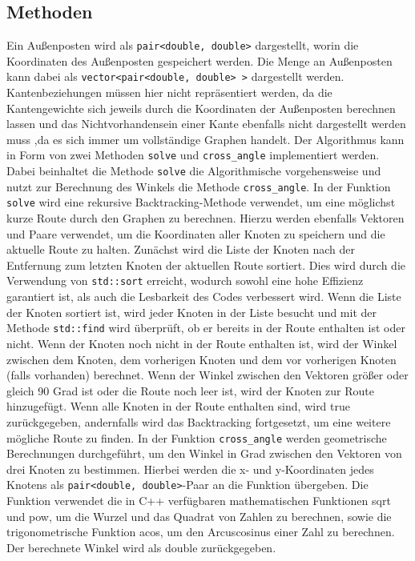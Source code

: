 \documentclass[a4paper,10pt,ngerman]{scrartcl}
\begin{document}
    \subsection{Methoden}\label{subsec:methoden}
    Ein Außenposten wird als \texttt{pair<double, double>} dargestellt, worin die Koordinaten des Außenposten gespeichert werden.
    Die Menge an Außenposten kann dabei als \texttt{vector<pair<double, double> >} dargestellt werden.
    Kantenbeziehungen müssen hier nicht repräsentiert werden, da die Kantengewichte sich jeweils durch die Koordinaten der Außenposten berechnen lassen
    und das Nichtvorhandensein einer Kante ebenfalls nicht dargestellt werden muss ,da es sich immer um vollständige Graphen handelt.
    Der Algorithmus kann in Form von zwei Methoden \texttt{solve} und \texttt{cross\_angle} implementiert werden.
    \newline
    Dabei beinhaltet die Methode \texttt{solve} die Algorithmische vorgehensweise und nutzt zur Berechnung des Winkels die Methode \texttt{cross\_angle}.
    In der Funktion \texttt{solve} wird eine rekursive Backtracking-Methode verwendet, um eine möglichst kurze Route durch den Graphen zu berechnen.
    Hierzu werden ebenfalls Vektoren und Paare verwendet, um die Koordinaten aller Knoten zu speichern und die aktuelle Route zu halten.
    Zunächst wird die Liste der Knoten nach der Entfernung zum letzten Knoten der aktuellen Route sortiert.
    Dies wird durch die Verwendung von \texttt{std::sort} erreicht, wodurch sowohl eine hohe Effizienz garantiert ist,
    als auch die Lesbarkeit des Codes verbessert wird.
    Wenn die Liste der Knoten sortiert ist, wird jeder Knoten in der Liste besucht und mit der Methode \texttt{std::find} wird überprüft,
    ob er bereits in der Route enthalten ist oder nicht.
    Wenn der Knoten noch nicht in der Route enthalten ist, wird der Winkel zwischen dem Knoten, dem vorherigen Knoten und dem vor vorherigen Knoten (falls vorhanden) berechnet.
    Wenn der Winkel zwischen den Vektoren größer oder gleich 90 Grad ist oder die Route noch leer ist, wird der Knoten zur Route hinzugefügt.
    Wenn alle Knoten in der Route enthalten sind, wird true zurückgegeben, andernfalls wird das Backtracking fortgesetzt, um eine weitere mögliche Route zu finden.
    \newline
    In der Funktion \texttt{cross\_angle} werden geometrische Berechnungen durchgeführt, um den Winkel in Grad zwischen den Vektoren von drei Knoten zu bestimmen.
    Hierbei werden die x- und y-Koordinaten jedes Knotens als \texttt{pair<double, double>}-Paar an die Funktion übergeben.
    Die Funktion verwendet die in C++ verfügbaren mathematischen Funktionen sqrt und pow, um die Wurzel und das Quadrat von Zahlen zu berechnen,
    sowie die trigonometrische Funktion acos, um den Arcuscosinus einer Zahl zu berechnen.
    Der berechnete Winkel wird als double zurückgegeben.
\end{document}
